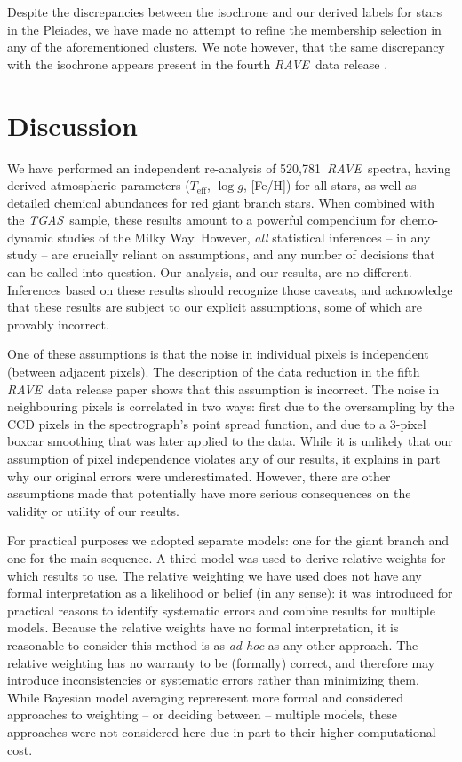 \documentclass[preprint]{aastex}
\newcommand{\acronym}[1]{{\small{#1}}}
\newcommand{\project}[1]{\textsl{#1}}
\newcommand{\rave}{\project{\acronym{RAVE}}}
\newcommand{\tgas}{\project{\acronym{TGAS}}}
\newcommand{\teff}{T_{\mathrm{eff}}}
\newcommand{\logg}{\log g}
\newcommand{\Nspectra}{520,781}
\begin{document}
Despite the discrepancies between the isochrone and our derived labels for stars
in the Pleiades, we have made no attempt to refine the membership selection in
any of the aforementioned clusters.  We note however, that the same discrepancy
with the isochrone appears present in the fourth \rave\ data release \citet{Kordopatis_2013}.


\section{Discussion}
\label{sec:discussion}


We have performed an independent re-analysis of \Nspectra\ \rave\ spectra,
having derived atmospheric parameters ($\teff$, $\logg$, [Fe/H]) for all stars,
as well as detailed chemical abundances for red giant branch stars.  When 
combined with the \tgas\ sample, these results amount to a powerful compendium 
for chemo-dynamic studies of the Milky Way.  However, \emph{all} statistical 
inferences -- in any study -- are crucially reliant on assumptions, and any 
number of decisions that can be called into question. Our analysis, and our
results, are no different. 
Inferences based on these results should recognize those caveats, and acknowledge
that these results are subject to our explicit assumptions, some of which are 
provably incorrect.


One of these assumptions is that the noise in individual pixels is independent
(between adjacent pixels). The description of the data reduction in the fifth 
\rave\ data release paper \citep{Kunder_2016} shows that this assumption is
incorrect.  The noise in neighbouring pixels is correlated in two ways: first
due to the oversampling by the CCD pixels in the spectrograph's point spread
function, and due to a 3-pixel boxcar smoothing that was later applied
to the data.  While it is unlikely that our assumption of pixel independence
violates any of our results, it explains in part why our original errors were
underestimated.  However, there are other assumptions made that potentially
have more serious consequences on the validity or utility of our results.


For practical purposes we adopted separate models: one for the giant branch and one
for the main-sequence.  A third model was used to derive relative weights for which
results to use.  The relative weighting we have used does not have any formal
interpretation as a likelihood or belief (in any sense): it was introduced for
practical reasons to identify systematic errors and combine results for multiple
models.  Because the relative weights have no formal interpretation, it is reasonable
to consider this method is as \emph{ad hoc} as any other approach.  The relative 
weighting has no warranty to be (formally) correct, and therefore may introduce 
inconsistencies or systematic errors rather than minimizing them.  While Bayesian
model averaging \citep[e.g., ][and similar methods]{Hoeting_1999} repreresent more
formal and considered approaches to weighting -- or deciding between -- multiple 
models, these approaches were not considered here due in part to their higher 
computational cost.
\end{document}
